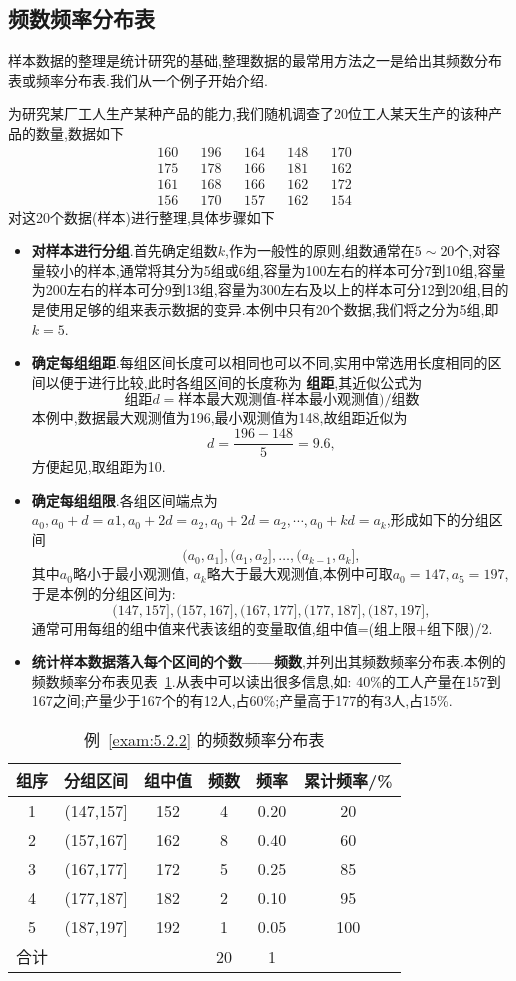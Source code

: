 \subsection{频数频率分布表\label{ssec:5.2.2}}
样本数据的整理是统计研究的基础,整理数据的最常用方法之一是给出其频数分布表或频率分布表.我们从一个例子开始介绍.
\begin{example}\label{exam:5.2.2}
为研究某厂工人生产某种产品的能力,我们随机调查了20位工人某天生产的该种产品的数量,数据如下
\begin{align*}
160&&196&&164&&148&&170&\\
175&&178&&166&&181&&162&\\
161&&168&&166&&162&&172&\\
156&&170&&157&&162&&154&
\end{align*}
对这20个数据(样本)进行整理,具体步骤如下
\begin{itemize}
\item  \textbf{对样本进行分组}.首先确定组数$k$,作为一般性的原则,组数通常在$5\sim20$个,对容量较小的样本,通常将其分为5组或6组,容量为100左右的样本可分7到10组,容量为200左右的样本可分9到13组,容量为300左右及以上的样本可分12到20组,目的是使用足够的组来表示数据的变异.本例中只有20个数据,我们将之分为5组,即$k=5$.
\item  \textbf{确定每组组距}.每组区间长度可以相同也可以不同,实用中常选用长度相同的区间以便于进行比较,此时各组区间的长度称为 \textbf{组距},其近似公式为
\[\text{组距}d=\text{样本最大观测值-样本最小观测值)}/\text{组数}\]
本例中,数据最大观测值为196,最小观测值为148,故组距近似为
\[d=\frac{196-148}5=9.6,\]
方便起见,取组距为10.
\item  \textbf{确定每组组限}.各组区间端点为$a_0,a_0+d=a1,a_0+2d=a_2,a_0+2d=a_2,\cdots,a_0+kd=a_k$,形成如下的分组区间
\[(a_0,a_1],(a_1,a_2],\dotsc,(a_{k-1},a_k],\]
其中$a_0$略小于最小观测值, $a_k$略大于最大观测值,本例中可取$a_0=147,a_5=197$,于是本例的分组区间为:
\[(147,157],(157,167],(167,177],(177,187],(187,197],\]
通常可用每组的组中值来代表该组的变量取值,组中值=(组上限$+$组下限)/2.
\item  \textbf{统计样本数据落入每个区间的个数——频数},并列出其频数频率分布表.本例的频数频率分布表见表~\ref{table5.2.1}.从表中可以读出很多信息,如: 40\%的工人产量在157到167之间;产量少于167个的有12人,占60\%;产量高于177的有3人,占15\%.
\end{itemize}
\end{example}
\begin{table}[!htp]
  \centering
  \caption{例~\ref{exam:5.2.2} 的频数频率分布表}\label{table5.2.1}
\begin{tabularx}{0.7\textwidth}{cccccc}
\toprule
组序&分组区间&组中值&频数&频率&累计频率/\%\\
\midrule
1&(147,157]&152&4&0.20&20\\
2&(157,167]&162&8&0.40&60\\
3&(167,177]&172&5&0.25&85\\
4&(177,187]&182&2&0.10&95\\
5&(187,197]&192&1&0.05&100\\
合计&&&20&1&\\
\bottomrule
\end{tabularx}
\end{table}
